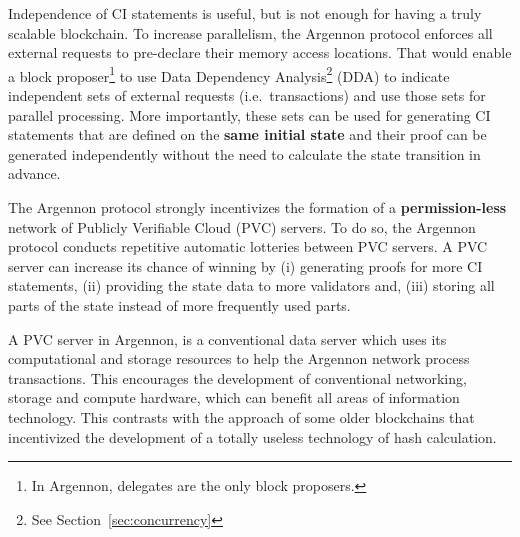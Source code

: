 Independence of CI statements is useful, but is not enough for having a truly scalable blockchain. To increase
parallelism, the Argennon protocol enforces all external requests to pre-declare their memory access locations. That
would enable a block proposer\footnote{In Argennon, delegates are the only block proposers.} to use Data Dependency
Analysis\footnote{See Section~\ref{sec:concurrency}} (DDA) to indicate independent sets of external requests (i.e.\
transactions) and use those sets for parallel processing. More importantly, these sets can be used for generating CI
statements that are defined on the \textbf{same initial state} and their proof can be generated independently without
the need to calculate the state transition in advance.

The Argennon protocol strongly incentivizes the formation of a \textbf{permission-less} network of Publicly Verifiable
Cloud (PVC) servers. To do so, the Argennon protocol conducts repetitive automatic lotteries between PVC servers.
A PVC server can increase its chance of winning by (i) generating proofs for more CI statements, (ii) providing the
state data to more validators and, (iii) storing all parts of the state instead of more frequently used parts.

A PVC server in Argennon, is a conventional data server which uses its computational and
storage resources to help the Argennon network process transactions. This encourages the development
of conventional networking, storage and compute hardware, which can benefit all areas of information technology.
This contrasts with the approach of some older blockchains that incentivized the development of a totally
useless technology of hash calculation.

